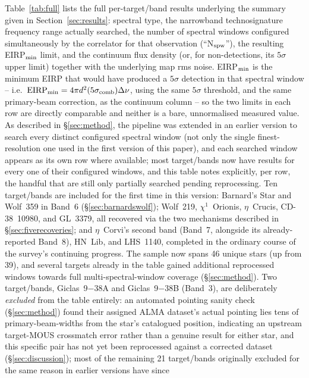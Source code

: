\documentclass{openjournal}
\begin{document}
Table~\ref{tab:full} lists the full per-target/band results underlying the
summary given in Section~\ref{sec:results}: spectral type, the narrowband
technosignature frequency range actually searched, the number of spectral
windows configured simultaneously by the correlator for that observation
(``N$_{\rm spw}$''), the resulting EIRP$_{\rm min}$ limit, and the
continuum flux density (or, for non-detections, its $5\sigma$ upper
limit) together with the underlying map rms noise. EIRP$_{\rm min}$ is
the minimum EIRP that would have produced a $5\sigma$ detection in that
spectral window -- i.e.\ $\mathrm{EIRP_{min}} = 4\pi d^{2}(5\sigma_{\rm
comb})\Delta\nu$, using the same $5\sigma$ threshold, and the same
primary-beam correction, as the continuum column -- so the two limits in
each row are directly comparable and neither is a bare, unnormalised
measured value. As described in \S\ref{sec:method}, the pipeline was
extended in an earlier version to search every distinct configured
spectral window (not only the single finest-resolution one used in the
first version of this paper), and each searched window appears as its
own row where available; most target/bands now have results for every
one of their configured windows, and this table notes explicitly, per
row, the handful that are still only partially searched pending
reprocessing. Ten target/bands are included for the first time in
this version: Barnard's Star and Wolf~359 in Band~6
(\S\ref{sec:barnardswolf}); Wolf~219, $\chi^{1}$~Orionis, $\eta$~Crucis,
CD-38~10980, and GL~3379, all recovered via the two mechanisms described
in \S\ref{sec:fiverecoveries}; and $\eta$~Corvi's second band (Band~7,
alongside its already-reported Band~8), HN~Lib, and LHS~1140, completed
in the ordinary course of the survey's continuing progress. The sample
now spans 46 unique stars (up from 39), and several targets already in
the table gained additional reprocessed windows towards full
multi-spectral-window coverage (\S\ref{sec:method}). Two
target/bands, Giclas~9$-$38A and Giclas~9$-$38B (Band~3), are
deliberately \emph{excluded} from the table entirely: an automated
pointing sanity check (\S\ref{sec:method}) found their assigned ALMA
dataset's actual pointing lies tens of primary-beam-widths from the
star's catalogued position, indicating an upstream target-MOUS
crossmatch error rather than a genuine result for either star, and this
specific pair has not yet been reprocessed against a corrected dataset
(\S\ref{sec:discussion}); most of the remaining 21 target/bands
originally excluded for the same reason in earlier versions have since
\end{document}
